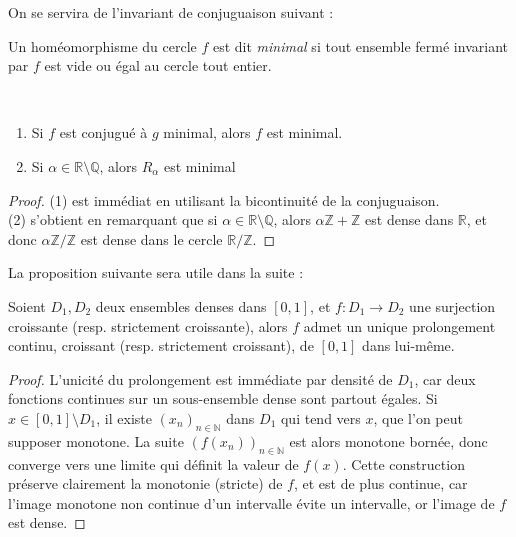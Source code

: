 \documentclass[11pt,a4paper]{article}
\begin{document}
On se servira de l'invariant de conjuguaison suivant : 

\begin{defin} 
Un homéomorphisme du cercle $f$ est dit \textit{minimal} si tout ensemble fermé invariant par  $f$ est vide ou égal au cercle tout entier. 
\end{defin}


\begin{prop}\label{minimal} ~
\begin{enumerate}
\item Si $f$ est conjugué à $g$ minimal, alors $f$ est minimal.
\item Si $\alpha \in \mathbb{R} \setminus \mathbb{Q}$, alors $R_\alpha$ est minimal
\end{enumerate}
\end{prop}

\begin{proof}
(1) est immédiat en utilisant la bicontinuité de la conjuguaison. \\
(2) s'obtient en remarquant que si $\alpha \in \mathbb{R} \setminus \mathbb{Q}$, alors $\alpha\mathbb{Z} + \mathbb{Z}$ est dense dans $\mathbb{R}$, et donc $\alpha\mathbb{Z}/\mathbb{Z}$ est dense dans le cercle $\mathbb{R}/\mathbb{Z}$. 
\end{proof}

La proposition suivante sera utile dans la suite :


\begin{prop}\label{dense}
Soient $D_1,D_2$ deux ensembles denses dans $[0,1]$, et $f : D_1 \to D_2$ une surjection croissante (resp. strictement croissante), alors $f$ admet un unique prolongement continu, croissant (resp. strictement croissant), de $[0,1]$ dans lui-même.
\end{prop}

\begin{proof}
L'unicité du prolongement est immédiate par densité de $D_1$, car deux fonctions continues sur un sous-ensemble dense sont partout égales. Si $x\in [0,1]\setminus D_1$, il existe $(x_n)_{n\in \mathbb{N}}$ dans $D_1$ qui tend vers $x$, que l'on peut supposer monotone. La suite $(f(x_n))_{n\in\mathbb{N}}$ est alors monotone bornée, donc converge vers une limite qui définit la valeur de $f(x)$.
Cette construction préserve clairement la monotonie (stricte) de $f$, et est de plus continue, car l'image monotone non continue d'un intervalle évite un intervalle, or l'image de $f$ est dense. 
\end{proof} 
\end{document}
